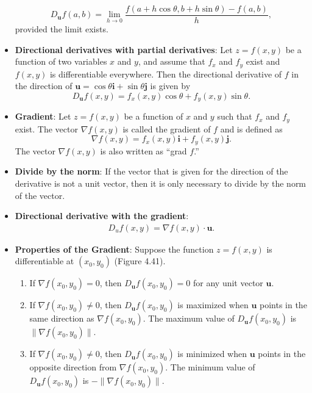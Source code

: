 \documentclass{report}
\begin{document}
\begin{itemize}
        \begin{equation}
            D_{\mathbf{u}}f(a,b) = \lim_{h \to 0} \frac{f(a+h\cos\theta, b+h\sin\theta) - f(a,b)}{h},
        \end{equation}
        provided the limit exists.
    \item \textbf{Directional derivatives with partial derivatives}:
        Let $z=f(x,y)$ be a function of two variables $x$ and $y$, and assume that $f_x$ and $f_y$ exist and $f(x, y)$ is differentiable everywhere. Then the directional derivative of $f$ in the direction of $\mathbf{u}=\cos\theta \mathbf{i} + \sin\theta \mathbf{j}$ is given by
        \[
            D_{\mathbf{u}}f(x,y) = f_x(x,y)\cos\theta + f_y(x,y)\sin\theta.
        \]
    \item \textbf{Gradient}:
        Let $z=f(x,y)$ be a function of $x$ and $y$ such that $f_x$ and $f_y$ exist. The vector $\nabla f(x,y)$ is called the gradient of $f$ and is defined as
        \begin{equation}
        \nabla f(x,y) = f_x(x,y)\mathbf{i} + f_y(x,y)\mathbf{j}.
        \end{equation}
        The vector $\nabla f(x,y)$ is also written as “grad $f$.”
    \item \textbf{Divide by the norm}: If the vector that is given for the direction of the derivative is not a unit vector, then it is only necessary to divide by the norm of the vector.
    \item \textbf{Directional derivative with the gradient}:
        \begin{align*}
            D_{u}f(x,y) = \nabla f(x,y) \cdot \mathbf{u}
        .\end{align*}
    \item \textbf{Properties of the Gradient}:
        Suppose the function $z=f(x,y)$ is differentiable at $(x_0,y_0)$ (Figure 4.41).
        \begin{enumerate}
            \item If $\nabla f(x_0,y_0) = 0$, then $D_{\mathbf{u}}f(x_0,y_0) = 0$ for any unit vector $\mathbf{u}$.
            \item If $\nabla f(x_0,y_0) \neq 0$, then $D_{\mathbf{u}}f(x_0,y_0)$ is maximized when $\mathbf{u}$ points in the same direction as $\nabla f(x_0,y_0)$. The maximum value of $D_{\mathbf{u}}f(x_0,y_0)$ is $\|\nabla f(x_0,y_0)\|$.
            \item If $\nabla f(x_0,y_0) \neq 0$, then $D_{\mathbf{u}}f(x_0,y_0)$ is minimized when $\mathbf{u}$ points in the opposite direction from $\nabla f(x_0,y_0)$. The minimum value of $D_{\mathbf{u}}f(x_0,y_0)$ is $-\|\nabla f(x_0,y_0)\|$.

\end{enumerate}
\end{itemize}
\end{document}
